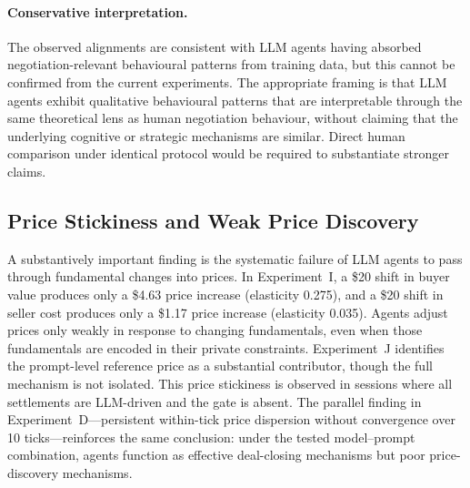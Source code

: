 \paragraph{Conservative interpretation.}
The observed alignments are consistent with LLM agents having absorbed negotiation-relevant behavioural patterns from training data, but this cannot be confirmed from the current experiments.  The appropriate framing is that LLM agents exhibit qualitative behavioural patterns that are interpretable through the same theoretical lens as human negotiation behaviour, without claiming that the underlying cognitive or strategic mechanisms are similar.  Direct human comparison under identical protocol would be required to substantiate stronger claims.

\subsection{Price Stickiness and Weak Price Discovery}
\label{sec:disc-failure}

A substantively important finding is the systematic failure of LLM agents to pass through fundamental changes into prices.  In Experiment~I, a \$20 shift in buyer value produces only a \$4.63 price increase (elasticity 0.275), and a \$20 shift in seller cost produces only a \$1.17 price increase (elasticity 0.035).  Agents adjust prices only weakly in response to changing fundamentals, even when those fundamentals are encoded in their private constraints.  Experiment~J identifies the prompt-level reference price as a substantial contributor, though the full mechanism is not isolated.  This price stickiness is observed in sessions where all settlements are LLM-driven and the gate is absent.  The parallel finding in Experiment~D---persistent within-tick price dispersion without convergence over 10 ticks---reinforces the same conclusion: under the tested model--prompt combination, agents function as effective deal-closing mechanisms but poor price-discovery mechanisms.

